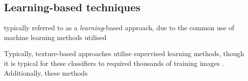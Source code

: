 \subsection{Learning-based techniques}
\label{sec:detection:learning_based}
typically referred to as a \textit{learning}-based approach, due to the common use of machine learning methods utilised

Typically, texture-based approaches utilise supervised learning methods, though it is typical for these classifiers to required thousands of training images \cite{Chen:2004ux}. Additionally, these methods